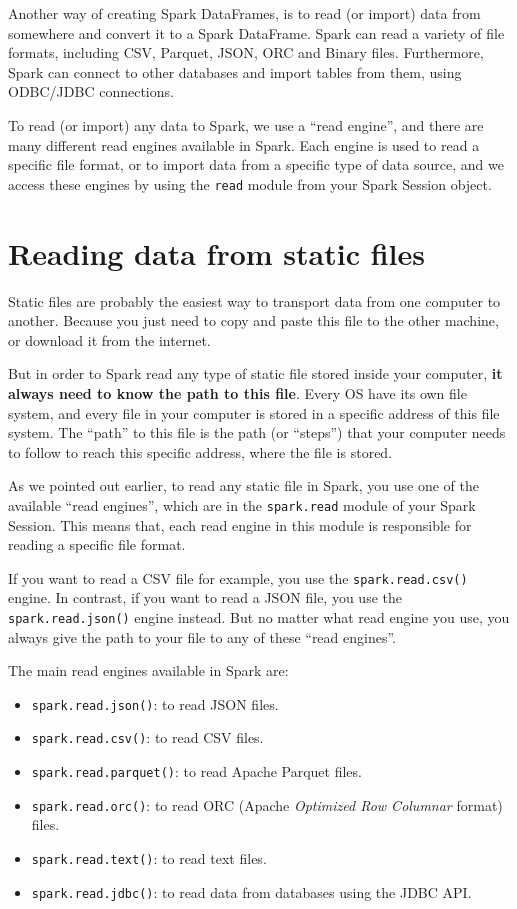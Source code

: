 \documentclass[
  11pt,
  letterpaper,
  DIV=11,
  numbers=noendperiod]{scrreprt}
\providecommand{\tightlist}{%
  \setlength{\itemsep}{0pt}\setlength{\parskip}{0pt}}\usepackage{longtable,booktabs,array}
\begin{document}
Another way of creating Spark DataFrames, is to read (or import) data
from somewhere and convert it to a Spark DataFrame. Spark can read a
variety of file formats, including CSV, Parquet, JSON, ORC and Binary
files. Furthermore, Spark can connect to other databases and import
tables from them, using ODBC/JDBC connections.

To read (or import) any data to Spark, we use a ``read engine'', and
there are many different read engines available in Spark. Each engine is
used to read a specific file format, or to import data from a specific
type of data source, and we access these engines by using the
\texttt{read} module from your Spark Session object.

\hypertarget{sec-read-files}{%
\section{Reading data from static files}\label{sec-read-files}}

Static files are probably the easiest way to transport data from one
computer to another. Because you just need to copy and paste this file
to the other machine, or download it from the internet.

But in order to Spark read any type of static file stored inside your
computer, \textbf{it always need to know the path to this file}. Every
OS have its own file system, and every file in your computer is stored
in a specific address of this file system. The ``path'' to this file is
the path (or ``steps'') that your computer needs to follow to reach this
specific address, where the file is stored.

As we pointed out earlier, to read any static file in Spark, you use one
of the available ``read engines'', which are in the \texttt{spark.read}
module of your Spark Session. This means that, each read engine in this
module is responsible for reading a specific file format.

If you want to read a CSV file for example, you use the
\texttt{spark.read.csv()} engine. In contrast, if you want to read a
JSON file, you use the \texttt{spark.read.json()} engine instead. But no
matter what read engine you use, you always give the path to your file
to any of these ``read engines''.

The main read engines available in Spark are:

\begin{itemize}
\tightlist
\item
  \texttt{spark.read.json()}: to read JSON files.
\item
  \texttt{spark.read.csv()}: to read CSV files.
\item
  \texttt{spark.read.parquet()}: to read Apache Parquet files.
\item
  \texttt{spark.read.orc()}: to read ORC (Apache \emph{Optimized Row
  Columnar} format) files.
\item
  \texttt{spark.read.text()}: to read text files.
\item
  \texttt{spark.read.jdbc()}: to read data from databases using the JDBC
  API.
\end{itemize}
\end{document}
